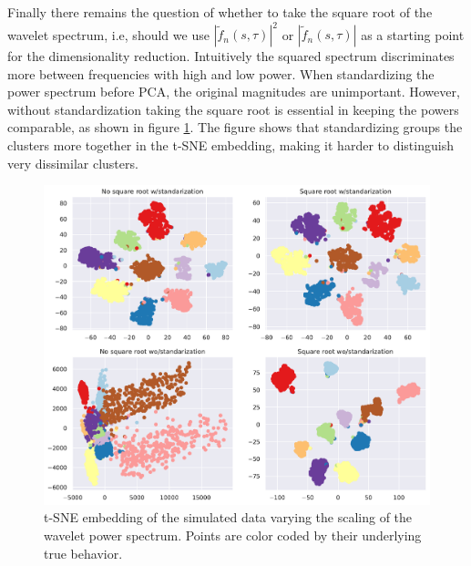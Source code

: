 \documentclass[a4paper, 10pt]{memoir}
\theoremstyle{plain}
\theoremstyle{definition}
\theoremstyle{remark}
\begin{document}
Finally there remains the question of whether to take the square root of the wavelet spectrum, i.e, should we use $|\tilde{f}_n(s, \tau)|^2$ or $|\tilde{f}_n(s, \tau)|$ as a starting point for the dimensionality reduction.
Intuitively the squared spectrum discriminates more between frequencies with high and low power. 
When standardizing the power spectrum before PCA, the original magnitudes are unimportant.
However, without standardization taking the square root is essential in keeping the powers comparable, as shown in figure \ref{fig:test_scaling}.
The figure shows that standardizing groups the clusters more together in the t-SNE embedding, making it harder to distinguish very dissimilar clusters.
\begin{figure}[tb]
        \centering
        \includegraphics[width=1\linewidth]{./code/figures/test_scaling.pdf}
        \caption{t-SNE embedding of the simulated data varying the scaling of the wavelet power spectrum.
        Points are color coded by their underlying true behavior.}
        \label{fig:test_scaling}
\end{figure}
\end{document}
